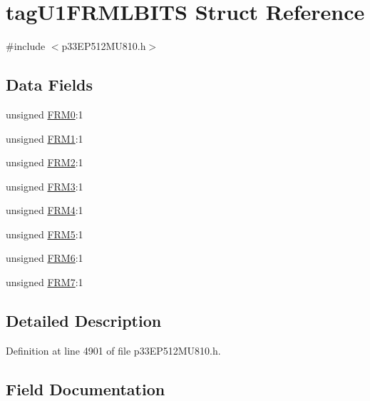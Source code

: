 \hypertarget{structtag_u1_f_r_m_l_b_i_t_s}{}\section{tag\+U1\+F\+R\+M\+L\+B\+I\+TS Struct Reference}
\label{structtag_u1_f_r_m_l_b_i_t_s}


{\ttfamily \#include $<$p33\+E\+P512\+M\+U810.\+h$>$}

\subsection*{Data Fields}
\begin{DoxyCompactItemize}
\item 
unsigned \hyperlink{structtag_u1_f_r_m_l_b_i_t_s_ae60ccf90796c2285241c28b2f0aa59d8}{F\+R\+M0}\+:1
\item 
unsigned \hyperlink{structtag_u1_f_r_m_l_b_i_t_s_a6260fd9e8c235c09a996ae93c8cb4dec}{F\+R\+M1}\+:1
\item 
unsigned \hyperlink{structtag_u1_f_r_m_l_b_i_t_s_a88fd76072b912f48ff7b4e8102de4212}{F\+R\+M2}\+:1
\item 
unsigned \hyperlink{structtag_u1_f_r_m_l_b_i_t_s_aa4df5003eb0239610c3a75f64cf31400}{F\+R\+M3}\+:1
\item 
unsigned \hyperlink{structtag_u1_f_r_m_l_b_i_t_s_a3a88e8b1199c2f171a8322efb95f3e69}{F\+R\+M4}\+:1
\item 
unsigned \hyperlink{structtag_u1_f_r_m_l_b_i_t_s_a073d6a0acfe3521b97a38a40753dcad5}{F\+R\+M5}\+:1
\item 
unsigned \hyperlink{structtag_u1_f_r_m_l_b_i_t_s_a7f1fb75180b0fd4761f3f14a87da6856}{F\+R\+M6}\+:1
\item 
unsigned \hyperlink{structtag_u1_f_r_m_l_b_i_t_s_ada5e8102b3206ad2fbd76a33049126b2}{F\+R\+M7}\+:1
\end{DoxyCompactItemize}


\subsection{Detailed Description}


Definition at line 4901 of file p33\+E\+P512\+M\+U810.\+h.



\subsection{Field Documentation}
\mbox{\label{structtag_u1_f_r_m_l_b_i_t_s_ae60ccf90796c2285241c28b2f0aa59d8}} 
